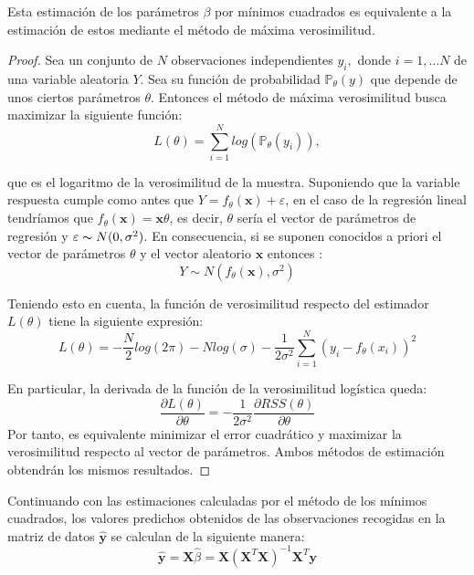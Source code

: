 \begin{propo}
Esta estimación de los parámetros $\beta$ por mínimos cuadrados es equivalente a la estimación de estos mediante el método de máxima verosimilitud.
\begin{proof}
Sea un conjunto de $N$ observaciones independientes $y_i, $ donde $i=1,\ldots N$ de una variable aleatoria $Y$. Sea su  función de probabilidad  $\mathbb{P}_\theta(y)$ que depende de unos ciertos parámetros $\theta$. Entonces el método de máxima verosimilitud busca maximizar la siguiente función:
\begin{equation}
L(\theta)=\sum_{i=1}^N log( \mathbb{P}_{\theta} (y_i)),
\end{equation}

\noindent que es el logaritmo de la  verosimilitud de la muestra. Suponiendo que la variable respuesta cumple como antes que  $Y=f_\theta (\textbf{x})+\varepsilon$, en el caso de la regresión lineal tendríamos que $f_\theta(\mathbf{x})=\mathbf{x}\theta$, es decir, $\theta$ sería el vector de parámetros de regresión y $\varepsilon \thicksim N(0,\sigma^2)$. En consecuencia, si se suponen conocidos a priori el vector de parámetros $\theta$ y el vector aleatorio $\textbf{x}$ entonces :
\begin{equation}
Y\sim N(f_\theta(\textbf{x}), \sigma^2)
\end{equation}

\noindent Teniendo esto en cuenta, la función de verosimilitud respecto del estimador $L(\theta)$ tiene la siguiente expresión:
\begin{equation}
L(\theta)=-\dfrac{N}{2}log(2\pi)-N log(\sigma)-\dfrac{1}{2\sigma^2}\sum_{i=1}^N (y_i-f_\theta(x_i))^2
\end{equation}

\noindent En particular, la derivada de la función de la verosimilitud logística queda:
\begin{equation}
\dfrac{\partial L(\theta)}{\partial \theta}=-\dfrac{1}{2\sigma^2}\dfrac{\partial RSS(\theta)}{\partial \theta}
\end{equation}
\noindent Por tanto, es equivalente minimizar el error cuadrático y maximizar la verosimilitud respecto al vector de parámetros. Ambos métodos de estimación obtendrán los mismos resultados. 
\end{proof}
\end{propo}

\noindent Continuando con las estimaciones calculadas por el método de los mínimos cuadrados, los valores predichos obtenidos de las observaciones recogidas en la matriz de datos $\hat{\textbf{y}}$ se calculan de la siguiente manera:
\begin{equation}
\hat{\textbf{y}}=\textbf{X}\hat{\beta}=\textbf{X}(\textbf{X}^T\textbf{X})^{-1}\textbf{X}^T\textbf{y}
\end{equation}

